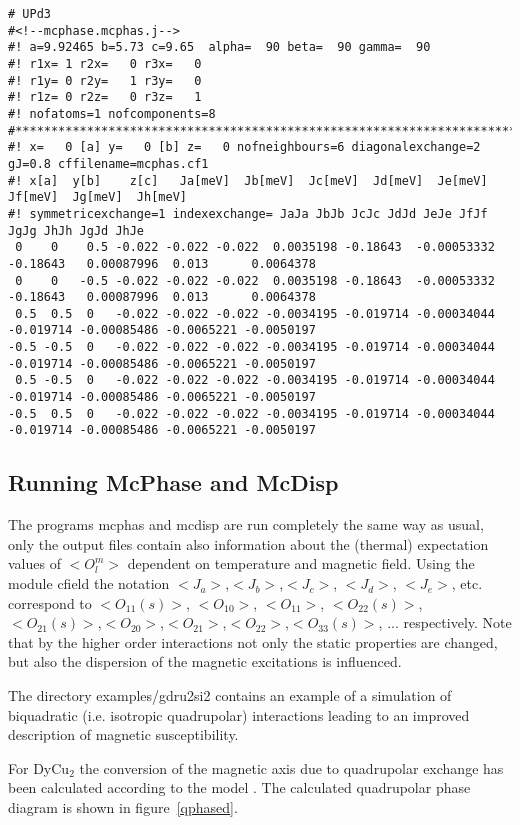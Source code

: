 {\footnotesize \begin{verbatim}
# UPd3 
#<!--mcphase.mcphas.j-->
#! a=9.92465 b=5.73 c=9.65  alpha=  90 beta=  90 gamma=  90
#! r1x= 1 r2x=   0 r3x=   0
#! r1y= 0 r2y=   1 r3y=   0
#! r1z= 0 r2z=   0 r3z=   1
#! nofatoms=1 nofcomponents=8
#*************************************************************************
#! x=   0 [a] y=   0 [b] z=   0 nofneighbours=6 diagonalexchange=2 gJ=0.8 cffilename=mcphas.cf1
#! x[a]  y[b]    z[c]   Ja[meV]  Jb[meV]  Jc[meV]  Jd[meV]  Je[meV]  Jf[meV]  Jg[meV]  Jh[meV]
#! symmetricexchange=1 indexexchange= JaJa JbJb JcJc JdJd JeJe JfJf JgJg JhJh JgJd JhJe
 0    0    0.5 -0.022 -0.022 -0.022  0.0035198 -0.18643  -0.00053332 -0.18643   0.00087996  0.013      0.0064378
 0    0   -0.5 -0.022 -0.022 -0.022  0.0035198 -0.18643  -0.00053332 -0.18643   0.00087996  0.013      0.0064378
 0.5  0.5  0   -0.022 -0.022 -0.022 -0.0034195 -0.019714 -0.00034044 -0.019714 -0.00085486 -0.0065221 -0.0050197
-0.5 -0.5  0   -0.022 -0.022 -0.022 -0.0034195 -0.019714 -0.00034044 -0.019714 -0.00085486 -0.0065221 -0.0050197
 0.5 -0.5  0   -0.022 -0.022 -0.022 -0.0034195 -0.019714 -0.00034044 -0.019714 -0.00085486 -0.0065221 -0.0050197
-0.5  0.5  0   -0.022 -0.022 -0.022 -0.0034195 -0.019714 -0.00034044 -0.019714 -0.00085486 -0.0065221 -0.0050197
\end{verbatim} }

\subsection{Running {\prg McPhase} and {\prg McDisp}}

The programs {\prg mcphas} and {\prg mcdisp} are run completely the same way as usual, only
the output files contain also information about the (thermal) expectation values of $<O_l^m>$
dependent on temperature and magnetic field. 
Using the module cfield the notation $<J_a>$,$<J_b>$,$<J_c>$,
$<J_d>$, $<J_e>$, etc. correspond to $<O_{11}(s)>$, $<O_{10}>$,
$<O_{11}>$, $<O_{22}(s)>$, $<O_{21}(s)>$,$<O_{20}>$,$<O_{21}>$,$<O_{22}>$,$<O_{33}(s)>$, ...
 respectively.
Note that by the higher order interactions not only the static properties are changed, but also the
dispersion of the magnetic excitations is influenced.


The directory {\prg examples/gdru2si2} contains an example of a simulation of biquadratic (i.e. isotropic %
quadrupolar) interactions leading to an improved description of magnetic susceptibility.

For DyCu$_2$ the conversion
of the magnetic axis due to quadrupolar exchange has been calculated according to the model 
\cite{yoshida98-1421}. The calculated quadrupolar phase diagram is shown in figure~\ref{qphased}.

